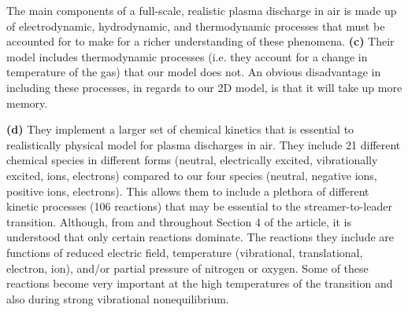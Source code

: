 \documentclass[]{article}
\begin{document}
	 The main components of a full-scale, realistic plasma discharge in air is made up of electrodynamic, hydrodynamic, and thermodynamic processes that must be accounted for to make for a richer understanding of these phenomena. \textbf{(c)} Their model includes thermodynamic processes (i.e. they account for a change in temperature of the gas) that our model does not. An obvious disadvantage in including these processes, in regards to our 2D model, is that it will take up more memory. 
	 
	 \textbf{(d)} They implement a larger set of chemical kinetics that is essential to realistically physical model for plasma discharges in air. They include 21 different chemical species in different forms (neutral, electrically excited, vibrationally excited, ions, electrons) compared to our four species (neutral, negative ions, positive ions, electrons). This allows them to include a plethora of different kinetic processes (106 reactions) that may be essential to the streamer-to-leader transition. Although, from \citet[Figure 11]{daSilva:2013a} and throughout Section 4 of the article, it is understood that only certain reactions dominate. The reactions they include are functions of reduced electric field, temperature (vibrational, translational, electron, ion), and/or partial pressure of nitrogen or oxygen. Some of these reactions become very important at the high temperatures of the transition and also during strong vibrational nonequilibrium. 
	 
\end{document}
